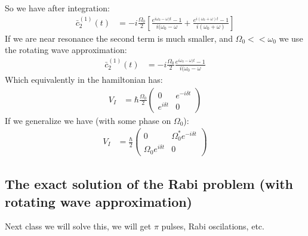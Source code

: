 So we have after integration:
\begin{align*}
	\bar{c}_2^{(1)}(t) &= -i\frac{\Omega_0}{2} \left[ \frac{e^{i\omega_0-\omega)t} -1 }{i(\omega_0-\omega} + \frac{e^{i(\omega_0 + \omega) t} - 1}{i(\omega_0 + \omega)}\right]
\end{align*}
If we are near resonance the second term is much smaller, and $\Omega_0 << \omega_0$ we use the rotating wave approximation:
\begin{align*}
	\bar{c}_2^{(1)}(t) &= -i\frac{\Omega_0}{2}\frac{e^{i\omega_0-\omega)t} -1 }{i(\omega_0-\omega} 
\end{align*}
Which equivalently in the hamiltonian has:
\begin{align*}
	V_I &= \hbar \frac{\Omega_0}{2} \begin{pmatrix}
		0 & e^{-i\delta t} \\
		e^{i\delta t} & 0
		\end{pmatrix}
\end{align*}
If we generalize we have (with some phase on $\Omega_0$):
\begin{align*}
	V_I &= \frac{\hbar }{2} \begin{pmatrix}
		0 & \Omega_0^*e^{-i\delta t} \\
		\Omega_0e^{i\delta t} & 0
		\end{pmatrix}
\end{align*}
\subsection{The exact solution of the Rabi problem (with rotating wave approximation)}
Next class we will solve this, we will get $\pi$ pulses, Rabi oscilations, etc.
